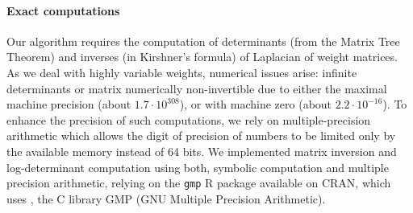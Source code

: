 \paragraph{Exact computations} Our algorithm requires the computation of determinants (from the Matrix Tree Theorem) and inverses (in Kirshner's formula) of Laplacian of weight matrices. As we deal with highly variable weights, numerical issues arise: infinite determinants or matrix numerically non-invertible due to either the maximal machine precision (about $1.7\cdot 10^{308}$), or with machine zero (about $2.2 \cdot 10^{-16}$). To enhance the precision of such computations, we rely on multiple-precision arithmetic which allows the digit of precision of numbers to be  limited only by the available memory instead of 64 bits. We implemented matrix inversion and log-determinant computation using both, symbolic computation and multiple precision arithmetic, relying on the \texttt{gmp} R package available on CRAN, which uses \citep{lucas2020package}, the C library GMP (GNU Multiple Precision Arithmetic). 

